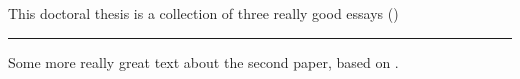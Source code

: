 
This doctoral thesis is a collection of three really good essays (\cite{Altmejd2018_predicting_replicability})

\lipsum[1]

\bigskip\fancybreak{{* * *}}\bigskip

Some more really great text about the second paper, based on \textcite{Camerer2016_evaluating_replicability}.

\lipsum[3-5]
